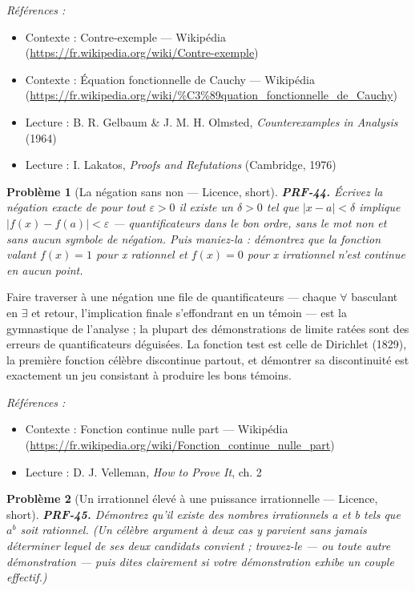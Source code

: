 \documentclass[11pt]{article}
\newtheorem{problem}{Problème}
\newenvironment{refs}{\par\small\noindent\emph{Références :}\begin{itemize}\setlength\itemsep{0pt}}{\end{itemize}\normalsize}
\begin{document}
\begin{refs}
\item Contexte : Contre-exemple --- Wikipédia (\url{https://fr.wikipedia.org/wiki/Contre-exemple})
\item Contexte : Équation fonctionnelle de Cauchy --- Wikipédia (\url{https://fr.wikipedia.org/wiki/%C3%89quation_fonctionnelle_de_Cauchy})
\item Lecture : B. R. Gelbaum \& J. M. H. Olmsted, \textit{Counterexamples in Analysis} (1964)
\item Lecture : I. Lakatos, \textit{Proofs and Refutations} (Cambridge, 1976)
\end{refs}

\bigskip

\begin{problem}[{La négation sans \og{} non \fg{} --- Licence, short}]
\textbf{PRF-44.} Écrivez la négation exacte de \og{} pour tout
$ \varepsilon >0 $ il existe un $ \delta >0 $ tel que
$ |x - a| <\delta $ implique $ |f(x) - f(a)| <\varepsilon $ \fg{} --- quantificateurs
dans le bon ordre, sans le mot \og{} non \fg{} et sans aucun symbole de négation. Puis maniez-la :
démontrez que la fonction valant $ f(x) = 1 $ pour x rationnel et $ f(x) = 0 $ pour x
irrationnel n'est continue en aucun point.
\end{problem}

\noindent Faire traverser à une négation une file de quantificateurs --- chaque $\forall$
basculant en $\exists$ et retour, l'implication finale s'effondrant en un témoin --- est la
gymnastique de l'analyse ; la plupart des démonstrations de limite ratées sont des erreurs
de quantificateurs déguisées. La fonction test est celle de Dirichlet (1829), la première
fonction célèbre discontinue partout, et démontrer sa discontinuité est exactement un jeu
consistant à produire les bons témoins.

\begin{refs}
\item Contexte : Fonction continue nulle part --- Wikipédia (\url{https://fr.wikipedia.org/wiki/Fonction_continue_nulle_part})
\item Lecture : D. J. Velleman, \textit{How to Prove It}, ch. 2
\end{refs}

\bigskip

\begin{problem}[{Un irrationnel élevé à une puissance irrationnelle --- Licence, short}]
\textbf{PRF-45.} Démontrez qu'il existe des nombres irrationnels a et
b tels que $ a^b $ soit rationnel. (Un célèbre argument à deux cas y parvient sans jamais
déterminer lequel de ses deux candidats convient ; trouvez-le --- ou toute autre démonstration
--- puis dites clairement si votre démonstration exhibe un couple effectif.)
\end{problem}
\end{document}

